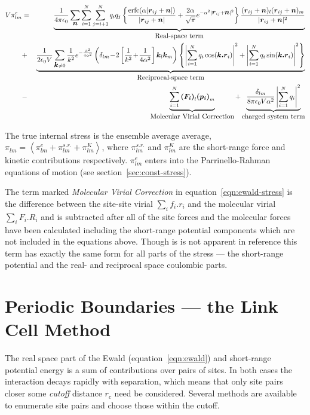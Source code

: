 \begin{eqnarray}
\label{eqn:ewald-stress}
V\pi_{lm}^e & = & \underbrace{\frac{1}{4 \pi \epsilon_0}
\sum_{\bm{n}}\sum_{i=1}^{N} \sum_{j=i+1}^{N} q_iq_j \left \lbrace 
\frac{\erfc( \alpha | \bm{r}_{ij} +  \bm{n} |)}{ | \bm{r}_{ij} +\bm{n} | } +
\frac{2 \alpha}{\sqrt{\pi}}e^{- \alpha^2 | \bm{r}_{ij} +  \bm{n} |^2}
\right \rbrace \frac{ (\bm{r}_{ij} + \bm{n})_l(\bm{r}_{ij} +
\bm{n})_m}{ | \bm{r}_{ij} + \bm{n} |^2}}_{\mbox{Real-space term}} \nonumber \\
 & + & \underbrace{\frac{1}{2 \epsilon_0 V} \sum_{\bm{k} \ne 0} \frac{1}{k^2}
       e^{-\frac{k^2}{4 \alpha^2}}
\left ( \delta_{lm}  \!- \! 2 \left [ \frac{1}{k^2} \! + \! \frac{1}{4 \alpha^2}
\right ] \bm{k}_l\bm{k}_m \right )\left \lbrace 
%
\left | \sum_{i=1}^{N} q_i \cos(\bm{k.r}_i) \right |^2 + 
\left | \sum_{i=1}^{N} q_i \sin(\bm{k.r}_i) \right |^2 
\right \rbrace}_{\mbox{Reciprocal-space term}} \nonumber \\
& - & \underbrace{\sum_{i=1}^{N}  \bm{(F_i)}_l \bm{(p_i)}_m}_{\mbox{Molecular
Virial Correction}} 
+  \underbrace{ \frac{\delta_{lm}}{8 \pi \epsilon_0 V \alpha^2}
                    \left | \sum_{i=1}^N q_i 
		    \right |^2}_{\mbox{charged system term}}
\end{eqnarray}

The true internal stress is the ensemble average average, $\pi_{lm} =
\left < \pi_{lm}^e + \pi_{lm}^{s.r.} + \pi_{lm}^K \right >$, where
$\pi_{lm}^{s.r.}$ and $\pi_{lm}^K$ are the short-range force and
kinetic contributions respectively.  $\pi_{lm}^e$ enters into the
Parrinello-Rahman equations of motion (see
section~\ref{sec:const-stress}).

The term marked {\em Molecular Virial Correction} in
equation~\ref{eqn:ewald-stress} is the difference between the
site-site virial $\sum_i f_i.r_i$ and the molecular virial $\sum_i
F_i.R_i$ and is subtracted after all of the site forces and the
molecular forces have been calculated including the short-range
potential components which are not included in the equations above.
Though is is not apparent in reference \cite[Appendix A]{nose:83} this
term has exactly the same form for all parts of the stress --- the
short-range potential and the real- and reciprocal space coulombic
parts.

\section{Periodic Boundaries --- the Link Cell Method}
\label{sec:link-cell}
The real space part of the Ewald (equation~\ref{eqn:ewald}) and
short-range potential energy is a sum of contributions over pairs of
sites.  In both cases the interaction decays rapidly with separation,
which means that only site pairs closer some {\em cutoff} distance
$r_c$ need be considered.  Several methods are available to enumerate
site pairs and choose those within the cutoff.

